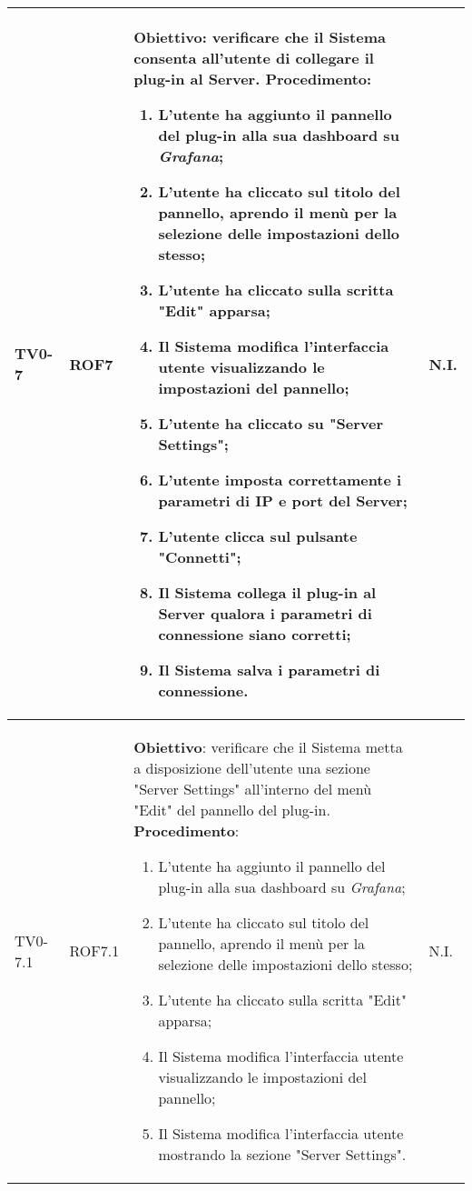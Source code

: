 \begin{longtable}{|C{.15\textwidth}|C{.13\textwidth}|m{.52\textwidth}|C{.08\textwidth}|}
TV0-7 & ROF7 &
	\textbf{Obiettivo}: verificare che il Sistema consenta all'utente di collegare il plug-in al Server. \newline
	\textbf{Procedimento}:
	\begin{enumerate}
		\item L'utente ha aggiunto il pannello del plug-in alla sua dashboard su \textit{Grafana};
		\item L'utente ha cliccato sul titolo del pannello, aprendo il menù per la selezione delle impostazioni dello stesso;
		\item L'utente ha cliccato sulla scritta "Edit" apparsa;
		\item Il Sistema modifica l'interfaccia utente visualizzando le impostazioni del pannello;
		\item L'utente ha cliccato su "Server Settings";
		\item L'utente imposta correttamente i parametri di IP e port del Server;
		\item L'utente clicca sul pulsante "Connetti";
		\item Il Sistema collega il plug-in al Server qualora i parametri di connessione siano corretti;
		\item Il Sistema salva i parametri di connessione.
	\end{enumerate}
	& N.I. \\
\hline

TV0-7.1 & ROF7.1 &
	\textbf{Obiettivo}: verificare che il Sistema metta a disposizione dell'utente una sezione "Server Settings" all'interno del menù "Edit" del pannello del plug-in. \newline
	\textbf{Procedimento}:
	\begin{enumerate}
		\item L'utente ha aggiunto il pannello del plug-in alla sua dashboard su \textit{Grafana};
		\item L'utente ha cliccato sul titolo del pannello, aprendo il menù per la selezione delle impostazioni dello stesso;
		\item L'utente ha cliccato sulla scritta "Edit" apparsa;
		\item Il Sistema modifica l'interfaccia utente visualizzando le impostazioni del pannello;
		\item Il Sistema modifica l'interfaccia utente mostrando la sezione "Server Settings".
	\end{enumerate}
	& N.I. \\
\hline


\end{longtable}
